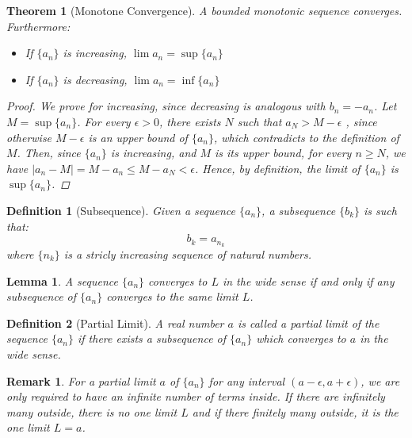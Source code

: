 \documentclass[12pt]{article}
\newtheorem{theorem}{Theorem}[subsection]
\newtheorem{definition}{Definition}[subsection]
\newtheorem{lemma}{Lemma}[subsection]
\newtheorem{remark}{Remark}[subsection]
\begin{document}
\begin{theorem}[Monotone Convergence]
  A bounded monotonic sequence converges. Furthermore: 
  \begin{itemize}
    \item[] If $\{a_n\}$ is increasing, $\lim a_n=\sup\{a_n\}$
    \item[] If $\{a_n\}$ is decreasing, $\lim a_n=\inf\{a_n\}$
  \end{itemize}
  \begin{proof}
    We prove for increasing, since decreasing is analogous with $b_n=-a_n$. Let $M=\sup\{a_n\}$. For every $\epsilon >0$, there exists $N$ such that $a_N > M-\epsilon$ , since otherwise $M-\epsilon$ is an upper bound of $\{ a_n \}$, which contradicts to the definition of $M$. Then, since $\{a_n\}$ is increasing, and $M$ is its upper bound, for every $n\geq N$, we have $|a_n-M|=M-a_n\leq M-a_N<\epsilon$. Hence, by definition, the limit of $\{a_n\}$ is $\sup\{a_n\}$.
  \end{proof}
\end{theorem}

\begin{definition}[Subsequence]
  Given a sequence $\{a_n\}$, a subsequence $\{b_k\}$ is such that: $$b_k=a_{n_k}$$
  where $\{n_k\}$ is a stricly increasing sequence of natural numbers.
\end{definition}

\begin{lemma}
  A sequence $\{a_n\}$ converges to $L$ in the wide sense if and only if any subsequence of $\{a_n\}$ converges to the same limit $L$.
\end{lemma}

\begin{definition}[Partial Limit]
  A real number $a$ is called a partial limit of the sequence $\{a_n\}$ if there exists a subsequence of $\{a_n\}$ which converges to $a$ in the wide sense.
\end{definition}

\begin{remark}
  For a partial limit $a$ of $\{a_n\}$ for any interval $(a-\epsilon,a+\epsilon)$, we are only required to have an infinite number of terms inside. If there are infinitely many outside, there is no one limit $L$ and if there finitely many outside, it is the one limit $L=a$.
\end{remark}
\end{document}
